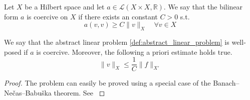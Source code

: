 \begin{definition}[Coercivity]
    \label{def:coercivity}
    Let $X$ be a Hilbert space and let $a \in  \mathcal{L} ( X \times  X,\mathbb{R} )  $. We say that the bilinear form $a$ is coercive on $X$ if there exists an constant $C > 0 $ s.t. \[
     a( v,v) \ge  C \| v \|_{ X }^{  } \quad  \forall v \in  X
    \]
\end{definition}


\begin{lemma}
    \label{def:lax-milgram}
    We say that the abstract linear problem \ref{def:abstract_linear_problem} is well-posed if $a$ is coercive. Moreover, the following a priori estimate holds true.\[
    \| v \|_{ X }^{  } \le \frac{1}{C} \| f \|_{ X'  }^{  }
    \]
\end{lemma}
\begin{proof}
    The problem can easily be proved using a special case of the Banach–Nečas–Babuška theorem. See \cite[Lemma 1.4]{pietro2012}
\end{proof}




